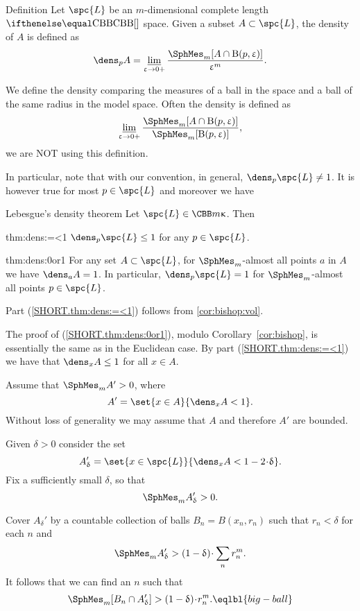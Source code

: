 \begin{thm}{Definition}
Let $\spc{L}$ be an $m$-dimensional complete length $\Alex{}$ space.
Given a subset $A\subset\spc{L}$, 
the density of $A$ is defined as
\[\dens_p A
=
\liminf_{\eps\to0+}
\frac{\SphMes_m[A\cap \oBall(p,\eps)]}{\eps^{m}}.\]

\end{thm}

We define the density comparing 
the measures of a ball in the space 
and a ball of the same radius in the model space.
Often the density is defined as 
\[\liminf_{\eps\to0+}\frac{\SphMes_m[A\cap\oBall(p,\eps)]}{\SphMes_m[\oBall(p,\eps)]},\]
we are NOT using this definition.

In particular, note that with our convention, in general, $\dens_p \spc{L}\ne1$. It is however true for most $p\in \spc{L}$ and moreover we have






\begin{thm}{Lebesgue's density theorem}\label{thm:dens}
Let $\spc{L}\in\CBB m\kappa$.
Then 
\begin{subthm}{thm:dens:=<1}
$\dens_p\spc{L}\le 1$ for any $p\in \spc{L}$.
\end{subthm}

\begin{subthm}{thm:dens:0or1}
For any set $A\subset \spc{L}$,
for 
$\SphMes_m$-almost all points $a$ in $A$ 
we have
$\dens_aA=1$. In particular, $\dens_p\spc{L}= 1$ for 
$\SphMes_m$-almost all points $p\in\spc{L}$.
\end{subthm}

\end{thm}

Part (\ref{SHORT.thm:dens:=<1}) follows from \ref{cor:bishop:vol}.

The proof of (\ref{SHORT.thm:dens:0or1}), 
modulo Corollary~\ref{cor:bishop},
is essentially the same as in the Euclidean case. By part  (\ref{SHORT.thm:dens:=<1})  we have that $\dens_xA\le1$ for all $x\in A$.

Assume that $\SphMes_m A'>0$,
where 
\[A'=\set{x\in A}{\dens_xA<1}.\]
Without loss of generality we may assume that $A$ 
and therefore $A'$ are bounded.

Given $\delta>0$ consider the set 
\[A'_\delta=\set{x\in\spc{L}}{\dens_xA<1-2\cdot\delta}.\]
Fix a sufficiently small $\delta$, 
so that 
\[\SphMes_m A'_\delta>0.\]

Cover $A_\delta'$ by a countable collection of balls $B_n=B(x_n,r_n)$
such that $r_n<\delta$ for each $n$ and
\[\SphMes_m  A'_\delta>(1-\delta)\cdot\sum_n r_n^{m}
.\]
It follows that we can find an $n$ such that
\[\SphMes_m [B_n\cap A'_\delta]
>
(1-\delta)\cdot r_n^{m}.\eqlbl{big-ball}\]

